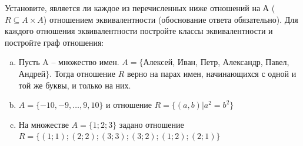 \question
Установите, является ли каждое из перечисленных ниже отношений на А ($R \subseteq A \times A$) отношением эквивалентности (обоснование ответа обязательно). Для каждого отношения эквивалентности постройте классы 
эквивалентности и постройте граф отношения:
\begin{enumerate} [a)]\setcounter{enumi}{0}
\item Пусть A – множество имен. $A = \{ $Алексей, Иван, Петр, Александр, Павел, Андрей$ \}$. Тогда отношение $R$ верно на парах имен, начинающихся с одной и той же буквы, и только на них.
\item $A = \{-10, -9, … , 9, 10\}$ и отношение $ R = \{(a,b)|a^{2} = b^{2}\}$
\item На множестве $A = \{1; 2; 3\}$ задано отношение $R = \{(1; 1); (2; 2); (3; 3); (3; 2); (1; 2); (2; 1)\}$
\end{enumerate}